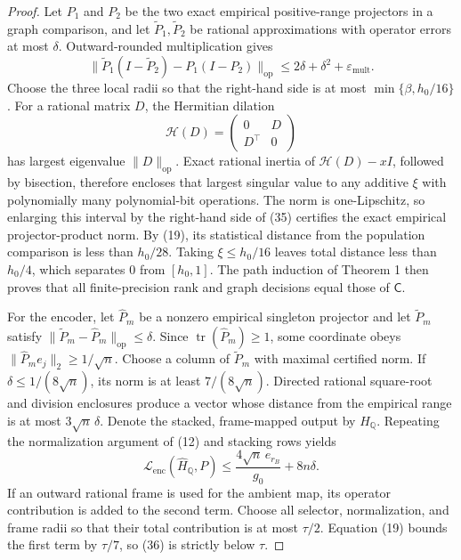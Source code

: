 \documentclass{article}
\begin{document}
\begin{proof}
Let \(P_1\) and \(P_2\) be the two exact empirical positive-range projectors in a graph comparison, and let \(\widetilde P_1,\widetilde P_2\) be rational approximations with operator errors at most \(\delta\).  Outward-rounded multiplication gives
\[
 \|\widetilde P_1(I-\widetilde P_2)-P_1(I-P_2)\|_{\mathrm{op}}
 \le2\delta+\delta^2+\varepsilon_{\mathrm{mult}}.
 \tag{35}
\]
Choose the three local radii so that the right-hand side is at most \(\min\{\beta,h_0/16\}\).  For a rational matrix \(D\), the Hermitian dilation
\[
 \mathcal H(D)=
 \begin{pmatrix}0&D\\D^{\top}&0\end{pmatrix}
\]
has largest eigenvalue \(\|D\|_{\mathrm{op}}\).  Exact rational inertia of \(\mathcal H(D)-xI\), followed by bisection, therefore encloses that largest singular value to any additive \(\xi\) with polynomially many polynomial-bit operations.  The norm is one-Lipschitz, so enlarging this interval by the right-hand side of (35) certifies the exact empirical projector-product norm.  By (19), its statistical distance from the population comparison is less than \(h_0/28\).  Taking \(\xi\le h_0/16\) leaves total distance less than \(h_0/4\), which separates \(0\) from \([h_0,1]\).  The path induction of Theorem 1 then proves that all finite-precision rank and graph decisions equal those of \(\mathsf C\).

For the encoder, let \(\widehat P_m\) be a nonzero empirical singleton projector and let \(\widetilde P_m\) satisfy \(\|\widetilde P_m-\widehat P_m\|_{\mathrm{op}}\le\delta\).  Since \(\operatorname{tr}(\widehat P_m)\ge1\), some coordinate obeys \(\|\widehat P_me_j\|_2\ge1/\sqrt n\).  Choose a column of \(\widetilde P_m\) with maximal certified norm.  If \(\delta\le1/(8\sqrt n)\), its norm is at least \(7/(8\sqrt n)\).  Directed rational square-root and division enclosures produce a vector whose distance from the empirical range is at most \(3\sqrt n\,\delta\).  Denote the stacked, frame-mapped output by \(\widehat H_{\mathbb Q}\).  Repeating the normalization argument of (12) and stacking rows yields
\[
 \mathcal L_{\mathrm{enc}}(\widehat H_{\mathbb Q},P)
 \le\frac{4\sqrt n\,e_{r_B}}{g_0}+8n\delta.
 \tag{36}
\]
If an outward rational frame is used for the ambient map, its operator contribution is added to the second term.  Choose all selector, normalization, and frame radii so that their total contribution is at most \(\tau/2\).  Equation (19) bounds the first term by \(\tau/7\), so (36) is strictly below \(\tau\).


\end{proof}
\end{document}
